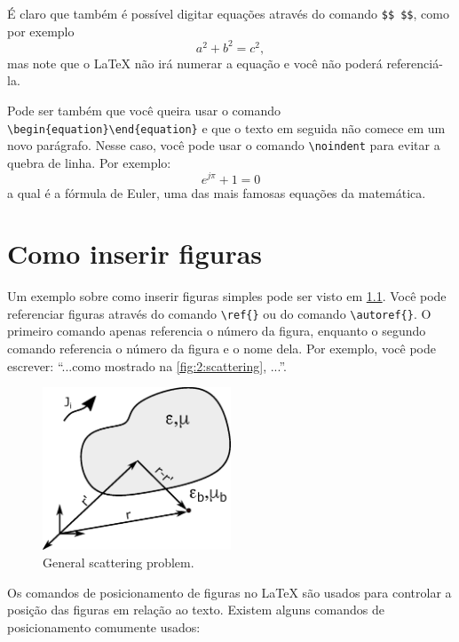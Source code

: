 		É claro que também é possível digitar equações através do comando \verb|$$ $$|, como por exemplo $$a^2 + b^2 = c^2,$$ mas note que o LaTeX não irá numerar a equação e você não poderá referenciá-la.
		
		Pode ser também que você queira usar o comando \verb|\begin{equation}\end{equation}| e que o texto em seguida não comece em um novo parágrafo. Nesse caso, você pode usar o comando \verb|\noindent| para evitar a quebra de linha. Por exemplo:
		\begin{equation}
			e^{j\pi} + 1 = 0
		\end{equation}
		\noindent a qual é a fórmula de Euler, uma das mais famosas equações da matemática.

	\chapter{Como inserir figuras}

		Um exemplo sobre como inserir figuras simples pode ser visto em \ref{fig:2:scattering}. Você pode referenciar figuras através do comando \verb|\ref{}| ou do comando \verb|\autoref{}|. O primeiro comando apenas referencia o número da figura, enquanto o segundo comando referencia o número da figura e o nome dela. Por exemplo, você pode escrever: ``...como mostrado na \autoref{fig:2:scattering}, ...''.
		\begin{figure}[h]
			\centering
			\includegraphics[width=0.5\textwidth]{./figuras/scattering}
			\caption{General scattering problem.}
			\label{fig:2:scattering}
		\end{figure}

		Os comandos de posicionamento de figuras no LaTeX são usados para controlar a posição das figuras em relação ao texto. Existem alguns comandos de posicionamento comumente usados:

